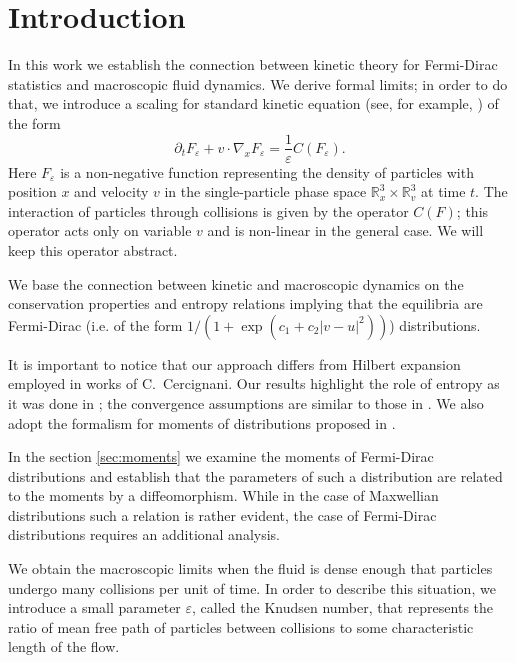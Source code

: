 
 
\section{Introduction}
In this work we establish the connection between kinetic theory for Fermi-Dirac statistics and macroscopic fluid dynamics. We derive formal limits; in order to do that, we introduce a scaling for standard kinetic equation (see, for example, \cite{Lifshitz1981Course}) of the form
\begin{equation}\label{eq:scaled}
\partial_t F_\varepsilon +v\cdot \nabla_xF_\varepsilon =\frac{1}{\varepsilon }C(F_\varepsilon ).
\end{equation}
Here $F_\varepsilon$ is a non-negative function representing the density of particles with position $x$ and velocity $v$ in the single-particle phase space $\mathbb R^3_x\times\mathbb R^3_v$ at time $t$. The interaction of particles through collisions is given by the operator $C(F)$; this operator acts only on variable $v$ and is non-linear in the general case. We will keep this operator abstract.

We base the connection between kinetic and macroscopic dynamics  on the 
 conservation properties and entropy relations
implying that the equilibria are Fermi-Dirac (i.e. of the form
$1/(1+\exp(c_1+c_2|v-u|^2))$) distributions.

It is important to notice that our approach differs from Hilbert expansion employed in works of C.~Cercignani. Our results highlight the role of entropy as it was done in \cite{Bardos1984Differents}; the convergence assumptions are similar to those in \cite{Bardos1991Fluid}. We also adopt the formalism for moments of distributions proposed in \cite{Bardos1991Fluidb}.

In the section \ref{sec:moments} we examine the moments of Fermi-Dirac distributions and establish that the parameters of such a distribution are related to the moments by a diffeomorphism. While in the case of Maxwellian distributions such a relation is rather evident, the case of Fermi-Dirac distributions requires an additional analysis.

We obtain the macroscopic limits when the fluid is dense enough that particles undergo many collisions per unit of time. In order to describe this situation, we introduce a small parameter $\varepsilon$, called the Knudsen number, that represents the ratio of mean free path of particles between collisions to some characteristic length of the flow. 

